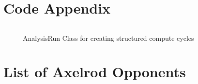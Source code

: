 \begin{appendices}
    \chapter{Code Appendix}\label{apndx:code}
    \begin{figure}[ht]
        \inputminted[fontsize=\small]{python}{./code_snippets/appendix/AnalysisRun.py}
        \caption{AnalysisRun Class for creating structured compute cycles}\label{code:AnalysisRun.py}
    \end{figure}


    
    \chapter{List of Axelrod Opponents}\label{apndx:opponents}
\end{appendices}